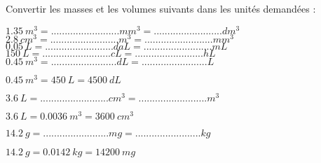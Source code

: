
Convertir les masses et les volumes suivants dans les unités demandées :\\
\begin{questions}

	
	
		\question $ \num{1.35}\ m^3 =  ......................... mm^3 = ......................... dm^3 $\\
		
		\question $ \num{2.8}\ cm^3 =  ......................... m^3 = ......................... mm^3 $\\
		
		\question $ \num{0.05}\ L =  .........................  daL = ......................... mL $\\
		
		\question $ \num{150}\ L =  .........................  cL = ......................... hL $\\
		
		
			
	
		
		\question $ \num{0.45}\  m^3 =........................dL =........................L  $\\
		\begin{solution}
			$ \num{0.45}\  m^3 = \num{450}\  L = \num{4500}\  dL $
		\end{solution}
	
			\question $ \num{3.6}\  L =  ......................... cm^3 = .........................m^3 $\\
		\begin{solution}
			$ \num{3.6}\  L =  \num{0.0036}\  m^3 = \num{3600}\  cm^3 $
		\end{solution}
		
		
		
		
		\question $\num{14.2}\  g =........................mg =........................kg $\\
		\begin{solution}
			$ \num{14.2}\  g = \num{0.0142}\  kg = \num{14200}\  mg $
		\end{solution}
		

\end{questions}
